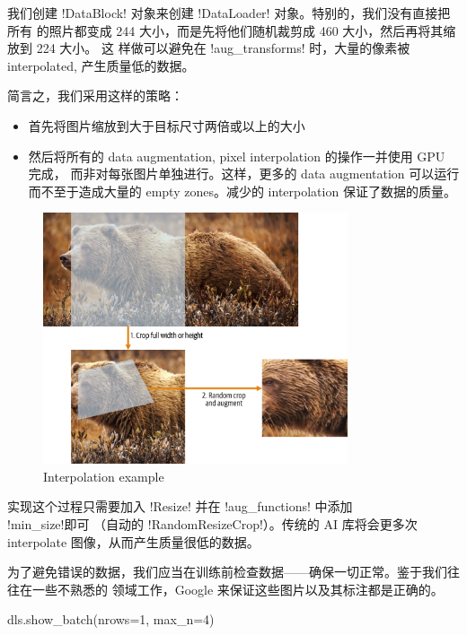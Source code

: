 \documentclass{ctexart}
\newenvironment{monos}{\VerbatimEnvironment\begin{pythoncode}}{\end{pythoncode}}
\begin{document}
我们创建 \mono!DataBlock! 对象来创建 \mono!DataLoader! 对象。特别的，我们没有直接把所有
的照片都变成 244 大小，而是先将他们随机裁剪成 460 大小，然后再将其缩放到 224 大小。 这
样做可以避免在 \mono!aug_transforms! 时，大量的像素被 interpolated, 产生质量低的数据。

简言之，我们采用这样的策略：

\begin{itemize}
    \item 首先将图片缩放到大于目标尺寸两倍或以上的大小
    \item 然后将所有的 data augmentation, pixel interpolation 的操作一并使用 GPU 完成，
          而非对每张图片单独进行。这样，更多的 data augmentation 可以运行而不至于造成大量的
          empty zones。减少的 interpolation 保证了数据的质量。
\end{itemize}

\begin{figure}[H]
    \centering
    \includegraphics[width=0.8\textwidth]{assets/interpolation_example.png}
    \caption{Interpolation example}
\end{figure}

实现这个过程只需要加入 \mono!Resize! 并在 \mono!aug_functions! 中添加 \\
\mono!min_size!即可 （自动的 \mono!RandomResizeCrop!）。传统的 AI 库将会更多次
interpolate 图像，从而产生质量很低的数据。

为了避免错误的数据，我们应当在训练前检查数据——确保一切正常。鉴于我们往往在一些不熟悉的
领域工作，Google 来保证这些图片以及其标注都是正确的。

\begin{monos}
dls.show_batch(nrows=1, max_n=4)
\end{monos}
\end{document}
